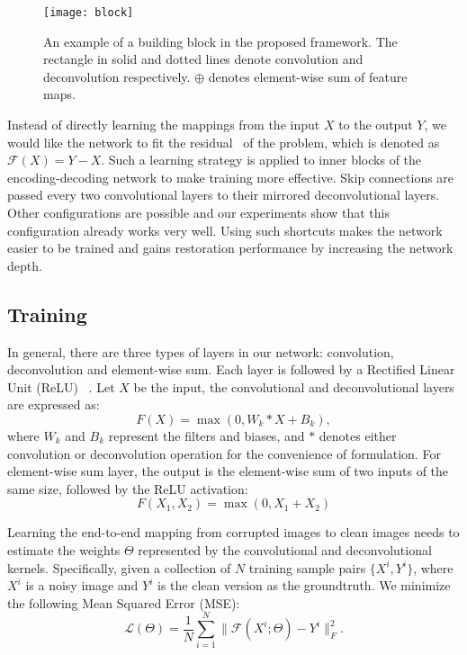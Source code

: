 \begin{figure}[htb!]
\centering
\texttt{[image: block]}
\caption{An example of a building block in the proposed framework. The rectangle in solid and
dotted lines denote convolution and deconvolution respectively. $\oplus$ denotes element-wise sum of feature maps.}
\label{fig4}
\end{figure}

Instead of directly learning the mappings from the input $X$ to the output $Y$, we would like the network
to fit the residual~\cite{DBLP:journals/corr/HeZRS15} of the problem, which is denoted as $\mathcal{F}(X)=Y-X$.
Such a learning strategy is applied to inner blocks of the encoding-decoding network to make training more
effective. Skip connections are passed every two convolutional layers to their mirrored deconvolutional
layers. Other configurations are possible and our experiments show that this configuration already works
very well. Using such shortcuts makes the network easier to be trained and gains restoration performance
by increasing the network depth.




\subsection{Training}

In general, there are three types of layers in our network: convolution, deconvolution
and element-wise sum. Each layer is followed by a Rectified Linear Unit (ReLU)
~\cite{DBLP:conf/icml/NairH10}. Let $X$ be the input, the convolutional and
deconvolutional layers are expressed as:
\begin{equation}
F(X) = \max(0,W_k * X + B_k),
\end{equation}
where $W_k$ and $B_k$ represent the filters and biases, and $*$ denotes either
convolution or deconvolution operation for the convenience of formulation.
For element-wise sum layer, the output is the element-wise sum of two inputs
of the same size, followed by the ReLU activation:
\begin{equation}
F(X_1,X_2) = \max(0, X_1 + X_2)
\end{equation}

Learning the end-to-end mapping from corrupted images to clean images needs to
estimate the weights $\Theta$ represented by the convolutional and deconvolutional
kernels. Specifically, given a collection of $N$ training sample pairs $\{X^i,Y^i\}$,
where $X^i$ is a noisy image and $Y^i$ is the clean version as the groundtruth.
We minimize the following Mean Squared Error (MSE):
\begin{equation}
  \mathcal{L}(\Theta) = \frac{1}{N}\sum_{i=1}^{N}\|\mathcal{F}(X^i;\Theta)-Y^i\|_F^2.
\label{eq1}
\end{equation}

